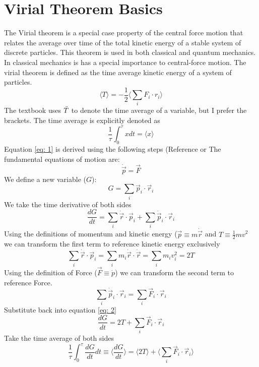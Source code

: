 \documentclass[12pt]{article}
\begin{document}
\section{Virial Theorem Basics}
    The Virial theorem is a special case property of the central force motion that relates the average over time of the total kinetic energy of a stable system of discrete particles. This theorem is used in both classical and quantum mechanics. In classical mechanics is has a special importance to central-force motion. 
    The virial theorem is defined as the time average kinetic energy of a system of particles.
    \begin{equation} \label{eq: 1}
        \langle T \rangle = - \frac{1}{2} \langle \sum_i F_i \cdot r_i \rangle
    \end{equation}
    The textbook uses $\Bar{T}$ to denote the time average of a variable, but I prefer the brackets. The time average is explicitly denoted as
    \[
        \frac{1}{\tau} \int_0^\tau x dt = \langle x \rangle
    \]
    Equation \ref{eq: 1} is derived using the following steps (Reference \cite{LibreTexts_Virial} or \cite{Classical}
    \newline The fundamental equations of motion are:
    \[
        \dot{\Vec{p}} = \Vec{F}
    \]
    We define a new variable ($G$):
    \[
        G = \sum_i \Vec{p}_i \cdot \Vec{r}_i
    \]
    We take the time derivative of both sides 
    \begin{equation} \label{eq: 2}
        \frac{d G}{dt} = \sum_i \dot{\Vec{r}} \cdot \Vec{p}_i + \sum_i \dot{\Vec{p}}_i \cdot \Vec{r}_i
    \end{equation}
    Using the definitions of momentum and kinetic energy ($\Vec{p} \equiv m \dot{\Vec{r}}$ and $T \equiv \frac{1}{2} m v^2$ we can transform the first term to reference kinetic energy exclusively
    \[
        \sum_i \dot{\Vec{r}} \cdot \Vec{p}_i = \sum_i m_i \dot{\Vec{r}} \cdot \dot{\Vec{r}} = \sum_i m_i v_i^2 = 2 T
    \]
    Using the definition of Force ($\Vec{F} \equiv \dot{p}$) we can transform the second term to reference Force.
    \[
        \sum_i \dot{\Vec{p}}_i \cdot \Vec{r}_i = \sum_i \Vec{F}_i \cdot \Vec{r}_i
    \]
    Substitute back into equation \ref{eq: 2} 
    \[
        \frac{d G}{dt} = 2 T + \sum_i \Vec{F}_i \cdot \Vec{r}_i
    \]
    Take the time average of both sides
    \[
        \frac{1}{\tau} \int_0^\tau \frac{d G}{dt} dt \equiv \langle \frac{d G}{dt} \rangle = \langle 2T \rangle + \langle \sum_i \Vec{F}_i \cdot \Vec{r}_i \rangle
    \]
\end{document}
